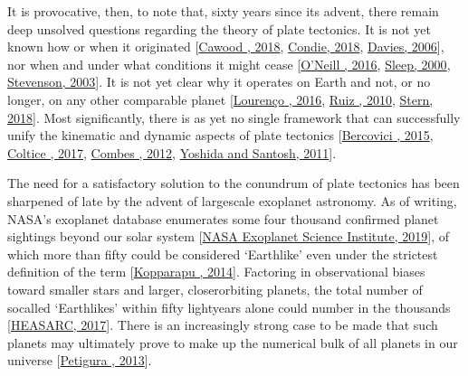 \documentclass[letterpaper,10pt,english]{jupyterBook}
\begin{document}
\sphinxAtStartPar
It is provocative, then, to note that, sixty years since its advent, there remain deep unsolved questions regarding the theory of plate tectonics. It is not yet known how or when it originated {[}\hyperlink{cite.references:id417}{Cawood , 2018}, \hyperlink{cite.references:id459}{Condie, 2018}, \hyperlink{cite.references:id54}{Davies, 2006}{]}, nor when and under what conditions it might cease {[}\hyperlink{cite.references:id224}{O'Neill , 2016}, \hyperlink{cite.references:id255}{Sleep, 2000}, \hyperlink{cite.references:id270}{Stevenson, 2003}{]}. It is not yet clear why it operates on Earth and not, or no longer, on any other comparable planet {[}\hyperlink{cite.references:id9}{Lourenço , 2016}, \hyperlink{cite.references:id174}{Ruiz , 2010}, \hyperlink{cite.references:id418}{Stern, 2018}{]}. Most significantly, there is as yet no single framework that can successfully unify the kinematic and dynamic aspects of plate tectonics {[}\hyperlink{cite.references:id434}{Bercovici , 2015}, \hyperlink{cite.references:id299}{Coltice , 2017}, \hyperlink{cite.references:id359}{Combes , 2012}, \hyperlink{cite.references:id748}{Yoshida and Santosh, 2011}{]}.

\sphinxAtStartPar
The need for a satisfactory solution to the conundrum of plate tectonics has been sharpened of late by the advent of large\sphinxhyphen{}scale exoplanet astronomy. As of writing, NASA’s exoplanet database enumerates some four thousand confirmed planet sightings beyond our solar system {[}\hyperlink{cite.references:id12}{NASA Exoplanet Science Institute, 2019}{]}, of which more than fifty could be considered ‘Earth\sphinxhyphen{}like’ even under the strictest definition of the term {[}\hyperlink{cite.references:id470}{Kopparapu , 2014}{]}. Factoring in observational biases toward smaller stars and larger, closer\sphinxhyphen{}orbiting planets, the total number of so\sphinxhyphen{}called ‘Earth\sphinxhyphen{}likes’ within fifty light\sphinxhyphen{}years alone could number in the thousands {[}\hyperlink{cite.references:id2}{HEASARC, 2017}{]}. There is an increasingly strong case to be made that such planets may ultimately prove to make up the numerical bulk of all planets in our universe {[}\hyperlink{cite.references:id287}{Petigura , 2013}{]}.
\end{document}
